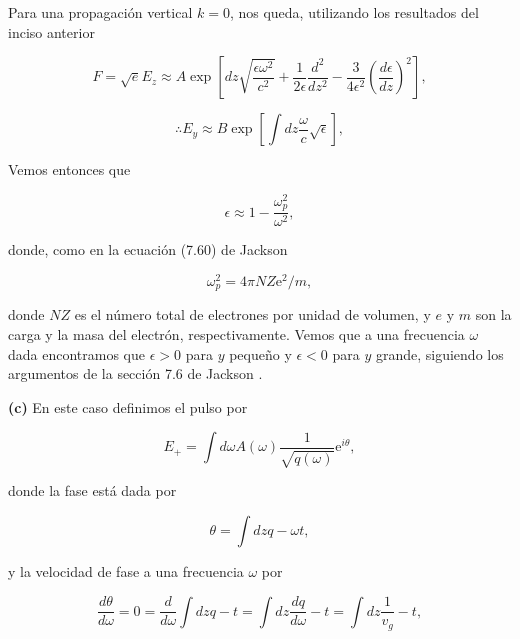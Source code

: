 \documentclass[a4paper,11pt]{article}
\numberwithin{equation}{section}
\newcommand{\euler}{\mathrm{e}}
\begin{document}
Para una propagación vertical $k=0$, nos queda, utilizando los resultados del 
inciso anterior

\begin{equation}
 F = \sqrt{e} E_z \approx A \exp{\left[dz \sqrt{\frac{\epsilon \omega^2}{c^2}} 
 + \frac{1}{2\epsilon} \frac{d^2}{dz^2} - \frac{3}{4\epsilon^2} 
 \left(\frac{d\epsilon}{dz}\right)^2 \right]},
\end{equation}

\begin{equation}
 \therefore E_y \approx B \exp{[\int dz \frac{\omega}{c}\sqrt{\epsilon}]},
\end{equation}

Vemos entonces que 

\begin{equation}
 \epsilon \approx 1 - \frac{\omega_p^2}{\omega^2},
\end{equation}

donde, como en la ecuación (7.60) de Jackson \cite{jackson}

\begin{equation}
\omega_p^2 = 4\pi N Z \euler^2 /m,
\end{equation}

donde $NZ$ es el número total de electrones por unidad de volumen, y $e$ y $m$ 
son la carga y la masa del electrón, respectivamente. Vemos que a una frecuencia 
$\omega$ dada encontramos que $\epsilon > 0$ para $y$ pequeño y $\epsilon < 0$ 
para $y$ grande, siguiendo los argumentos de la sección 7.6 de Jackson \cite{jackson}. 

\vspace{.3cm}

\textbf{(c)} En este caso definimos el pulso por 

\begin{equation}
 E_+ = \int d\omega A(\omega) \frac{1}{\sqrt{q(\omega)}} \euler^{i\theta}, 
\end{equation}

donde la fase está dada por 

\begin{equation}
 \theta = \int dz q - \omega t,
\end{equation}

y la velocidad de fase a una frecuencia $\omega$ por 

\begin{equation}
 \frac{d\theta}{d\omega} = 0 = \frac{d}{d\omega} \int dz q - t = 
 \int dz \frac{dq}{d\omega} - t = \int dz \frac{1}{v_g} - t,
\end{equation}
\end{document}
